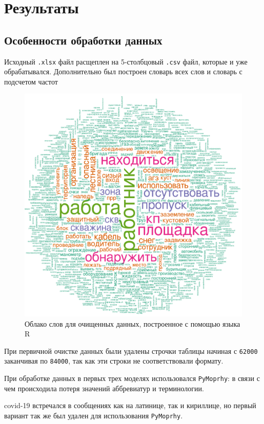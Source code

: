 \documentclass{article}
\begin{document}
\section{Результаты}

\subsection{Особенности обработки данных}
Исходный \texttt{.xlsx} файл расщеплен на 5-столбцовый \texttt{.csv} файл, которые и уже обрабатывался. Дополнительно был построен словарь всех слов и словарь с подсчетом частот

\begin{figure}[h!]
    \centering
    \includegraphics[scale=0.2]{image.png}
    \caption{Облако слов для очищенных данных, построенное с помощью языка R}
\end{figure}


При первичной очистке данных были удалены строчки таблицы начиная с \texttt{62000} заканчивая по \texttt{84000}, так как эти строки не соответствовали формату. 

При обработке данных в первых трех моделях использовался \texttt{PyMoprhy}: в связи с чем происходила потеря значений аббревиатур и терминологии.

covid-19 встречался в сообщениях как на латинице, так и кириллице, но первый вариант так же был удален для использования \texttt{PyMoprhy}.
\end{document}

